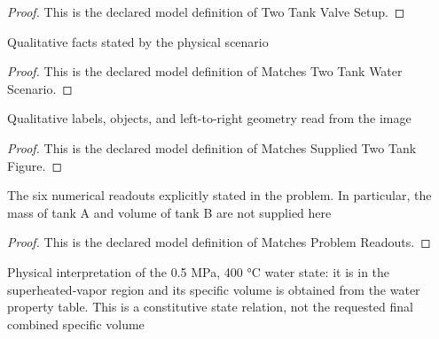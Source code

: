 \begin{proof}
  This is the declared model definition of Two Tank Valve Setup.
\end{proof}
\begin{definition}
  \label{def:physics:phyx-mini-0439:phyxminiproblems-problemphyxmini0439-matchestwotankwaterscenario}
  Qualitative facts stated by the physical scenario
\end{definition}
\begin{proof}
  This is the declared model definition of Matches Two Tank Water Scenario.
\end{proof}
\begin{definition}
  \label{def:physics:phyx-mini-0439:phyxminiproblems-problemphyxmini0439-matchessuppliedtwotankfigure}
  Qualitative labels, objects, and left-to-right geometry read from the image
\end{definition}
\begin{proof}
  This is the declared model definition of Matches Supplied Two Tank Figure.
\end{proof}
\begin{definition}
  \label{def:physics:phyx-mini-0439:phyxminiproblems-problemphyxmini0439-matchesproblemreadouts}
  The six numerical readouts explicitly stated in the problem. In particular, the mass of tank A and volume of tank B are not supplied here
\end{definition}
\begin{proof}
  This is the declared model definition of Matches Problem Readouts.
\end{proof}
\begin{definition}
  \label{def:physics:phyx-mini-0439:phyxminiproblems-problemphyxmini0439-satisfiestankbwaterpropertymodel}
  Physical interpretation of the 0.5 MPa, 400 °C water state: it is in the superheated-vapor region and its specific volume is obtained from the water property table. This is a constitutive state relation, not the requested final combined specific volume
\end{definition}
